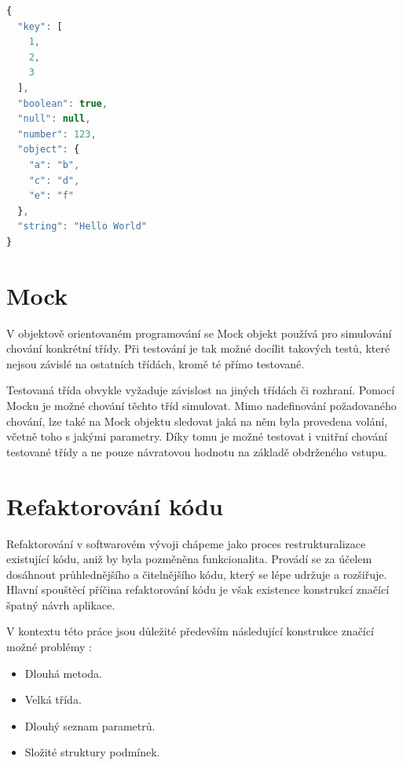 \documentclass[thesis=B,czech]{FITthesis}[2012/06/26]
\begin{document}
\begin{lstlisting}[language=JavaScript, caption={Ukázka formátu JSON}]
{
  "key": [
    1,
    2,
    3
  ],
  "boolean": true,
  "null": null,
  "number": 123,
  "object": {
    "a": "b",
    "c": "d",
    "e": "f"
  },
  "string": "Hello World"
}
\end{lstlisting}

\section{Mock}
V objektově orientovaném programování se Mock objekt používá pro simulování chování konkrétní třídy.\cite{mock}
Při testování je tak možné docílit takových testů, které nejsou závislé na ostatních třídách, kromě té přímo testované.
\par
Testovaná třída obvykle vyžaduje závislost na jiných třídách či rozhraní. Pomocí Mocku je možné chování těchto tříd simulovat.
Mimo nadefinování požadovaného chování, lze také na Mock objektu sledovat jaká na něm byla provedena volání, včetně toho
s jakými parametry. Díky tomu je možné testovat i vnitřní chování testované třídy a ne pouze návratovou hodnotu na základě 
obdrženého vstupu.\cite{mock}

\section{Refaktorování kódu}
Refaktorování v softwarovém vývoji chápeme jako proces restrukturalizace existující kódu, aniž by byla 
pozměněna funkcionalita. Provádí se za účelem dosáhnout průhlednějšího a čitelnějšího kódu, který
se lépe udržuje a rozšiřuje. \cite{refaktoring} Hlavní spouštěcí příčina refaktorování kódu je však existence 
konstrukcí značící špatný návrh aplikace. 

V kontextu této práce jsou důležité především následující konstrukce značící možné problémy \cite{refaktoring}:  
\begin{itemize}
\item Dlouhá metoda.
\item Velká třída.
\item Dlouhý seznam parametrů.
\item Složité struktury podmínek.
\end{itemize}
\end{document}
